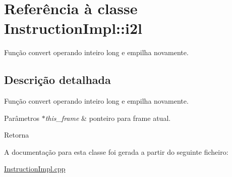 \hypertarget{class_instruction_impl_1_1i2l}{}\section{Referência à classe Instruction\+Impl\+:\+:i2l}
\label{class_instruction_impl_1_1i2l}


Função convert operando inteiro long e empilha novamente.  




\subsection{Descrição detalhada}
Função convert operando inteiro long e empilha novamente. 


\begin{DoxyParams}{Parâmetros}
{\em $\ast$this\+\_\+frame} & ponteiro para frame atual. \\
\hline
\end{DoxyParams}
\begin{DoxyReturn}{Retorna}

\end{DoxyReturn}


A documentação para esta classe foi gerada a partir do seguinte ficheiro\+:\begin{DoxyCompactItemize}
\item 
\hyperlink{_instruction_impl_8cpp}{Instruction\+Impl.\+cpp}\end{DoxyCompactItemize}

